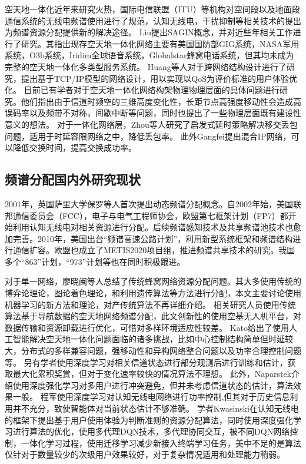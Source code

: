 空天地一体化近年来研究火热，国际电信联盟（ITU）等机构对空间段以及地面段通信系统的无线电频谱使用进行了规范，认知无线电，干扰抑制等相关技术的提出为频谱资源分配提供新的解决途径。
Liu提出SAGIN概念，并对近些年相关工作进行了研究\cite{8368236}。其指出现存空天地一体化网络主要有美国国防部GIG系统，NASA军用系统，O3b系统，Iridim全球语音系统，Globalstar蜂窝电话系统，但其均未成为完整的空天地一体化多类型服务系统。
Huang等人对于跨网络结构设计进行了研究，提出基于TCP/IP模型的网络设计，用以实现以QoS为评价标准的用户体验优化\cite{6587995}。
目前已有学者对于空天地一体化网络构架物理物理层面的具体问题进行研究\cite{7879675}。他们指出由于信道时频空的三维高度变化性，长距节点高强度移动性会造成高误码率以及频带不对称，间歇中断等问题，同时也提出了一些物理层面既有建设性意义的想法。
对于一体化网络层，Zhou等人研究了启发式延时策略解决移交丢包问题，适用于时延容限网络之中，降低丢包率\cite{8116396}。
此外Gangfei提出混合IP网络，可以降低交换时间，提高交换成功率\cite{7925019}。


\subsection{频谱分配国内外研究现状}

2001年，英国萨里大学保罗等人首次提出动态频谱分配概念。自2002年始，美国联邦通信委员会（FCC），电子与电气工程师协会，欧盟第七框架计划（FP7）都开始利用认知无线电对相关资源进行分配。后续频谱感知技术及共享频谱池技术也愈加完善。2010年，美国出台“频谱高速公路计划”，利用新型系统框架和频谱结构进行通信扩容。欧盟也成立了METIS2020项目组，推进频谱共享技术的研究。我国多个“863”计划，“973”计划等也在同时积极跟进。

对于单一网络，廖晓闽等人总结了传统蜂窝网络资源分配问题\cite{廖晓闽2019基于深度强化学习的蜂窝网资源分配算法}。其大多使用传统的博弈论理论\cite{6998030}，图论着色理论\cite{7833211}，和利用遗传算法\cite{8336853}等方法进行分配，本文主要讨论使用机器学习的新方法和理论，对产传统算法不再详细介绍。
相关研究人员使用传统算法基于导航数据的空天地网络频谱分配，此文创新性的使用空基无人机平台，对数据传输和资源卸载进行优化，可惜对多样环境适应性较差\cite{7127619}。
Kato给出了使用人工智能解决空天地一体化问题面临的诸多挑战，比如中心控制结构简单但时延较大，分布式的多样兼容问题，强移动性和异构网络整合问题以及功率合理控制问题等\cite{8612450}。
另有学者使用深度学习对相关信道状态进行部分观测后进行训练和估计，获取最大化累积奖赏，但对于变化速率较快的情况算法不理想\cite{8303773}。
此外，Naparstek介绍使用深度强化学习对多用户进行冲突避免，但并未考虑信道状态的估计，算法效果一般\cite{8254101}。
程军使用深度学习对认知无线电网络进行功率控制,但其对于历史信息利用并不充分，致使智能体对当前状态估计不够准确\cite{Li2018Intelligent}。
学者Kwasinski在认知无线电的框架下提出基于用户使用体验为判断准则的资源分配算法，同时使用深度强化学习进行算法的优化，使用多代理DQN技术，多代理协同交互，被不同DQN网络控制，一体化学习过程，使用迁移学习减少新接入终端学习任务，美中不足的是算法仅针对于数量较少的次级用户效果较好，对于复杂情况适用和处理能力稍弱\cite{8403658}。

